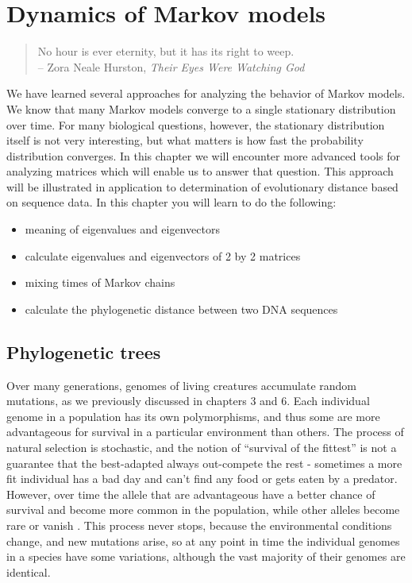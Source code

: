 \documentclass[
]{book}
\providecommand{\tightlist}{%
  \setlength{\itemsep}{0pt}\setlength{\parskip}{0pt}}
\theoremstyle{definition}
\theoremstyle{definition}
\theoremstyle{definition}
\theoremstyle{remark}
\begin{document}
\hypertarget{dynamics-of-markov-models}{%
\chapter{Dynamics of Markov models}\label{dynamics-of-markov-models}}

\begin{quote}
No hour is ever eternity, but it has its right to weep.\\
-- Zora Neale Hurston, \emph{Their Eyes Were Watching God}
\end{quote}

We have learned several approaches for analyzing the behavior of Markov models. We know that many Markov models converge to a single stationary distribution over time. For many biological questions, however, the stationary distribution itself is not very interesting, but what matters is how fast the probability distribution converges. In this chapter we will encounter more advanced tools for analyzing matrices which will enable us to answer that question. This approach will be illustrated in application to determination of evolutionary distance based on sequence data. In this chapter you will learn to do the following:

\begin{itemize}
\tightlist
\item
  meaning of eigenvalues and eigenvectors
\item
  calculate eigenvalues and eigenvectors of 2 by 2 matrices
\item
  mixing times of Markov chains
\item
  calculate the phylogenetic distance between two DNA sequences
\end{itemize}

\hypertarget{phylogenetic-trees}{%
\section{Phylogenetic trees}\label{phylogenetic-trees}}

Over many generations, genomes of living creatures accumulate random mutations, as we previously discussed in chapters 3 and 6. Each individual genome in a population has its own polymorphisms, and thus some are more advantageous for survival in a particular environment than others. The process of natural selection is stochastic, and the notion of ``survival of the fittest'' is not a guarantee that the best-adapted always out-compete the rest - sometimes a more fit individual has a bad day and can't find any food or gets eaten by a predator. However, over time the allele that are advantageous have a better chance of survival and become more common in the population, while other alleles become rare or vanish \citep{futuyma_evolution_2009}. This process never stops, because the environmental conditions change, and new mutations arise, so at any point in time the individual genomes in a species have some variations, although the vast majority of their genomes are identical.
\end{document}
